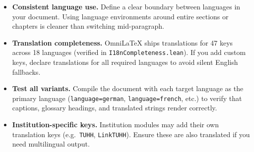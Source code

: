 \begin{itemize}
  \item \textbf{Consistent language use.}  Define a clear boundary between
    languages in your document.  Using language environments around entire
    sections or chapters is cleaner than switching mid-paragraph.

  \item \textbf{Translation completeness.}  OmniLaTeX ships translations
    for 47 keys across 18 languages (verified in
    \texttt{I18nCompleteness.lean}).  If you add custom keys, declare
    translations for all required languages to avoid silent English
    fallbacks.

  \item \textbf{Test all variants.}  Compile the document with each
    target language as the primary language (\texttt{language=german},
    \texttt{language=french}, etc.) to verify that captions, glossary
    headings, and translated strings render correctly.

  \item \textbf{Institution-specific keys.}  Institution modules may
    add their own translation keys (e.g.\ \texttt{TUHH},
    \texttt{LinkTUHH}).  Ensure these are also translated if you
    need multilingual output.
\end{itemize}
